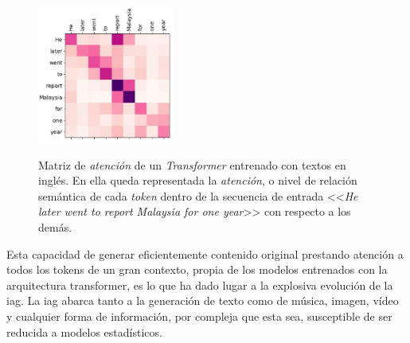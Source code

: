 \begin{figure}[H]
    \caption[Matriz de \emph{atención} de un \emph{Transformer} entrenado con textos en inglés]{Matriz de \emph{atención} de un \emph{Transformer} entrenado con textos en inglés. En ella queda representada la \emph{atención}, o nivel de relación semántica de cada \emph{token} dentro de la secuencia de entrada <<\emph{He later went to report Malaysia for one year}>> con respecto a los demás.}
    \centering
    \includegraphics[width=0.4\textwidth]{./figuras/Transformer_attention_matrix.png}
    \label{fig:transformer_attention}
\end{figure}

Esta capacidad de generar eficientemente contenido original prestando atención a todos los tokens de un gran contexto, propia de los modelos entrenados con la arquitectura transformer, es lo que ha dado lugar a la explosiva evolución de la \gls{iag}. La \gls{iag} abarca tanto a la generación de texto como de música, imagen, vídeo y cualquier forma de información, por compleja que esta sea, susceptible de ser reducida a modelos estadísticos.